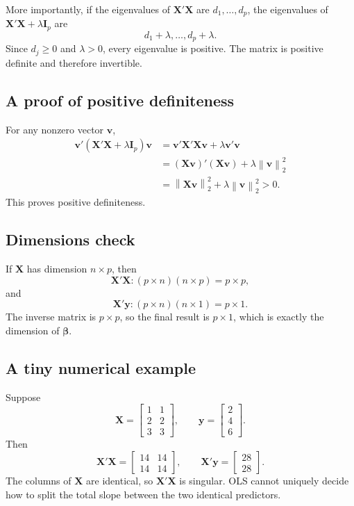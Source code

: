 \documentclass[11pt,a4paper]{article}
\numberwithin{equation}{section}
\theoremstyle{remark}
\newcommand{\X}{\mathbf X}
\newcommand{\y}{\mathbf y}
\newcommand{\I}{\mathbf I}
\newcommand{\bta}{\boldsymbol{\beta}}
\newcommand{\norm}[1]{\left\lVert #1\right\rVert_2}
\begin{document}
More importantly, if the eigenvalues of $\X'\X$ are
$d_1,\ldots,d_p$, the eigenvalues of
$\X'\X+\lambda\I_p$ are
\[
d_1+\lambda,\ldots,d_p+\lambda.
\]
Since $d_j\geq0$ and $\lambda>0$, every eigenvalue is positive. The matrix
is positive definite and therefore invertible.

\subsection{A proof of positive definiteness}
For any nonzero vector $\mathbf v$,
\[
\begin{aligned}
\mathbf v'(\X'\X+\lambda\I_p)\mathbf v
&=\mathbf v'\X'\X\mathbf v+\lambda\mathbf v'\mathbf v\\
&=(\X\mathbf v)'(\X\mathbf v)+\lambda\norm{\mathbf v}^2\\
&=\norm{\X\mathbf v}^2+\lambda\norm{\mathbf v}^2>0.
\end{aligned}
\]
This proves positive definiteness.

\subsection{Dimensions check}
If $\X$ has dimension $n\times p$, then
\[
\X'\X:(p\times n)(n\times p)=p\times p,
\]
and
\[
\X'\y:(p\times n)(n\times1)=p\times1.
\]
The inverse matrix is $p\times p$, so the final result is $p\times1$,
which is exactly the dimension of $\bta$.

\subsection{A tiny numerical example}
Suppose
\[
\X=\begin{bmatrix}1&1\\2&2\\3&3\end{bmatrix},
\qquad
\y=\begin{bmatrix}2\\4\\6\end{bmatrix}.
\]
Then
\[
\X'\X=\begin{bmatrix}14&14\\14&14\end{bmatrix},
\qquad
\X'\y=\begin{bmatrix}28\\28\end{bmatrix}.
\]
The columns of $\X$ are identical, so $\X'\X$ is singular. OLS cannot
uniquely decide how to split the total slope between the two identical
predictors.
\end{document}
